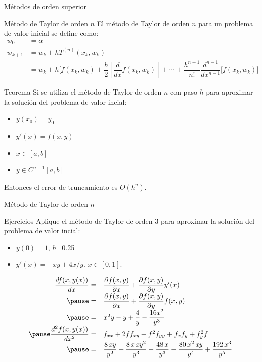 \begin{frame}{Métodos de orden superior}
\begin{block}{Método de Taylor de orden $n$}
El método de Taylor de orden $n$ para un problema de valor inicial se define como:
\begin{align*}
w_0&=\alpha\\
w_{k+1}&=w_k+hT^{(n)}(x_k,w_k)\\
&=w_k+h\bigg[f(x_k,w_k)+\dfrac{h}{2}[\dfrac{d}{dx}f(x_k,w_k)]+\cdots +\dfrac{h^{n-1}}{n!}\dfrac{d^{n-1}}{dx^{n-1}}[f(x_k,w_k)\bigg]
\end{align*}
\end{block}
\begin{block}{Teorema}
Si se utiliza el método de Taylor de orden $n$ con paso $h$ para aproximar la solución  del problema de valor incial:
\begin{itemize}
\item $y(x_0)=y_0$
\item $y'(x)=f(x,y)$
\item $x\in[a,b]$
\item $y\in C^{n+1}[a,b]$
\end{itemize}
Entonces el error de truncamiento es $O(h^n)$.
\end{block}
\end{frame}
\begin{frame}{Método de Taylor de orden $n$}
\begin{block}{Ejercicios}
Aplique el método de Taylor de orden 3 para aproximar la solución del problema de valor incial:
\begin{itemize}
\item $y(0)=1$, $h$=0.25
\item $y'(x)=-xy+4x/y$. $x\in[0,1]$.
\end{itemize}
\end{block}
\textcolor{red}{
\begin{displaymath}
\begin{array}{rl}
\dfrac{df(x,y(x))}{dx}=&\dfrac{\partial f(x,y)}{\partial x}+\dfrac{\partial f(x,y)}{\partial y}y'(x)\\\pause
=&\dfrac{\partial f(x,y)}{\partial x}+\dfrac{\partial f(x,y)}{\partial y}f(x,y)\\\pause
=&x^2y-y+\dfrac{4}{y}-\dfrac{16x^2}{y^3}\\\pause
\dfrac{d^2f(x,y(x))}{dx^2}=&f_{xx}+2ff_{xy}+f^2f_{yy}+f_xf_y+f_y^2f\\\pause
=&\displaystyle{{8\,{\it xy}}\over{y^2}}+{{8\,x\,{\it xy}^2}\over{y^3}}-{{48\,x
 }\over{y^3}}-{{80\,x^2\,{\it xy}}\over{y^4}}+{{192\,x^3}\over{y^5}}\\
\end{array}
\end{displaymath}
}
\end{frame}
